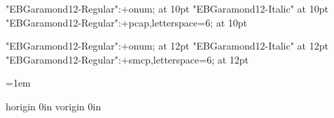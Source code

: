 




\font\tenrm "EBGaramond12-Regular":+onum; at 10pt
\font\tenit "EBGaramond12-Italic" at 10pt
\font\tensc "EBGaramond12-Regular":+pcap,letterspace=6; at 10pt

\font\twelverm "EBGaramond12-Regular":+onum; at 12pt
\font\twelveit "EBGaramond12-Italic" at 12pt
\font\twelvesc "EBGaramond12-Regular":+smcp,letterspace=6; at 12pt

\def\normalsize{%
	\gdef\rm{\tenrm}%
	\gdef\it{\tenit}%
	\gdef\sc{\tensc}%
}

\def\headingIsize{%
	\gdef\rm{\twelverm}%
	\gdef\it{\twelveit}%
	\gdef\sc{\twelvesc}%
}

\let\emph\it

\normalsize\rm



\baselineskip=15pt

\frenchspacing

\parskip=0pt

\parindent=1em

\emergencystretch=0pt
\hfuzz=3pt


\def\firstnoindent{\global\everypar={\wipeeverypar\setbox7=\lastbox}}
\def\wipeeverypar{\global\everypar={}}

{}


\pagewidth=210mm	
\pageheight=297mm

\pdfvariable horigin 0in	
\pdfvariable vorigin 0in

